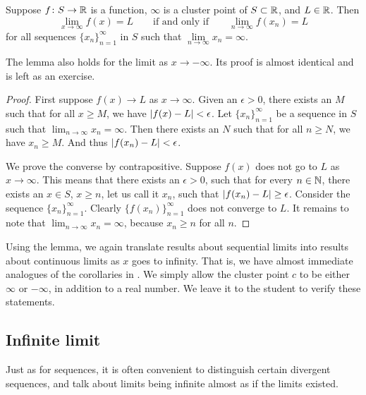 \begin{lemma} \label{seqflimitinf:lemma}
Suppose $f \colon S \to {\mathbb{R}}$ is a function, $\infty$ is a cluster
point of $S \subset {\mathbb{R}}$, and $L \in {\mathbb{R}}$.  Then
\begin{equation*}
\lim_{x\to\infty} f(x) = L
\qquad \text{if and only if} \qquad
\lim_{n\to\infty} f(x_n) = L
\end{equation*}
for all sequences $\{ x_n \}_{n=1}^\infty$ in $S$ such that $\lim\limits_{n\to\infty} x_n = \infty$.
\end{lemma}

The lemma also holds for the limit as $x \to -\infty$.
Its proof is almost identical and
is left as an exercise.

\begin{proof}
First suppose $f(x) \to L$ as $x \to \infty$.
Given an $\epsilon > 0$, there exists an $M$ such that for all $x \geq M$,
we have $\left\lvert {f(x)-L} \right\rvert < \epsilon$.
Let $\{ x_n \}_{n=1}^\infty$
be a sequence in $S$ such that $\lim_{n\to\infty} x_n = \infty$.  Then there exists an
$N$ such that for all $n \geq N$, we have $x_n \geq M$.  And thus
$\left\lvert {f(x_n)-L} \right\rvert < \epsilon$.

We prove the converse by contrapositive.  Suppose $f(x)$ does
not go to $L$ as $x \to \infty$.
This means that there exists an $\epsilon > 0$,
such that for every $n \in {\mathbb{N}}$, there exists an $x \in S$, $x \geq n$, let
us call it $x_n$, such that $\left\lvert {f(x_n)-L} \right\rvert \geq \epsilon$.
Consider the sequence $\{ x_n \}_{n=1}^\infty$.  Clearly 
$\bigl\{ f(x_n) \bigr\}_{n=1}^\infty$ does not converge to $L$.  It remains to note
that $\lim_{n\to\infty} x_n = \infty$, because $x_n \geq n$ for all $n$.
\end{proof}

Using the lemma, we again translate results about sequential
limits into results about continuous limits as $x$ goes to infinity.  That
is, we have almost immediate analogues of the corollaries
in .  We simply allow 
the cluster point $c$ to be either $\infty$ or $-\infty$, in addition
to a real number.  We leave it to
the student to verify these statements.

\subsection{Infinite limit}

Just as for sequences, it is often convenient to distinguish certain
divergent sequences, and talk about limits being infinite
almost as if the limits existed.

